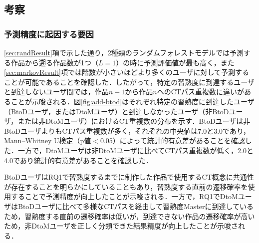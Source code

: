 \documentclass[submit]{ipsj}
\begin{document}
\vspace{-5mm}
\subsection{考察}


\subsubsection{予測精度に起因する要因}

\ref{sec:randResult}項で示した通り，2種類のランダムフォレストモデルでは予測する作品から遡る作品数が1つ（$L=1$）の時に予測評価値が最も高く，また\ref{sec:markovResult}項では階数が小さいほどより多くのユーザに対して予測することが可能であることを確認した．したがって，特定の習熟度に到達するユーザと到達しないユーザ間では，作品$n-1$から作品$n$へのCTパス重複数に違いがあることが示唆される．図\ref{fig:add-btod}はそれぞれ特定の習熟度に到達したユーザ（BtoDユーザ，またはDtoMユーザ）と到達しなかったユーザ（非BtoDユーザ，または非DtoMユーザ）におけるCT\textcolor{red}{}重複数の分布を示す．BtoDユーザは非BtoDユーザよりもCTパス重複数が多く，それぞれの中央値は7.0と3.0であり，Mann–Whitney U検定（p値$<$0.05）によって統計的有意差があることを確認した．一方で，DtoMユーザは非DtoMユーザに比べてCTパス重複数が低く，\textcolor{red}{}2.0と4.0であり統計的有意差があることを確認した．

BtoDユーザはRQ1で習熟度\textcolor{red}{}するまでに制作した作品で使用するCT概念に共通性が存在することを明らかにしていることもあり，習熟度\textcolor{red}{}する直前の遷移確率を使用することで予測精度が向上したことが示唆される．一方で，RQ1でDtoMユーザはBtoDユーザに比べて多様なCTパスを経由して習熟度Masterに到達しているため，習熟度\textcolor{red}{}する直前の遷移確率は低いが，到達できない作品の遷移確率が高いため，非DtoMユーザを正しく分類できた結果精度が向上したことが示唆される．



\end{document}
